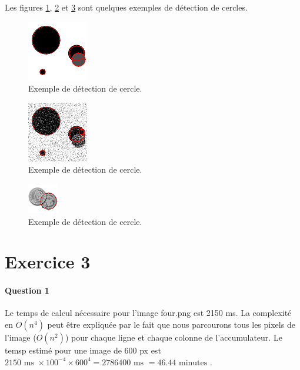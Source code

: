 \documentclass[a4paper,twocolumn]{article}
\begin{document}
Les figures \ref{detection_four}, \ref{detection_fourn} et \ref{detection_coins} sont quelques exemples de détection de cercles.

\begin{figure}[h]
	\centering\includegraphics{images/detection_four.png}
	\caption{Exemple de détection de cercle.}
	\label{detection_four}
\end{figure}

\begin{figure}[h]
	\centering\includegraphics{images/detection_fourn.png}
	\caption{Exemple de détection de cercle.}
	\label{detection_fourn}
\end{figure}

\begin{figure}[h]
	\centering\includegraphics{images/detection_coins.png}
	\caption{Exemple de détection de cercle.}
	\label{detection_coins}
\end{figure}

\section{Exercice 3}

\paragraph{Question 1} Le temps de calcul nécessaire pour l'image four.png est 2150 ms. La complexité en $O(n^4)$ peut être expliquée par le fait que nous parcourons tous les pixels de l'image ($O(n^2)$) pour chaque ligne et chaque colonne de l'accumulateur. Le temsp estimé pour une image de 600 px est $2150 \text{ ms } \times 100^{-4} \times 600^4 = 2786400 \text{ ms } = 46.44 \text{ minutes }$.
\end{document}
